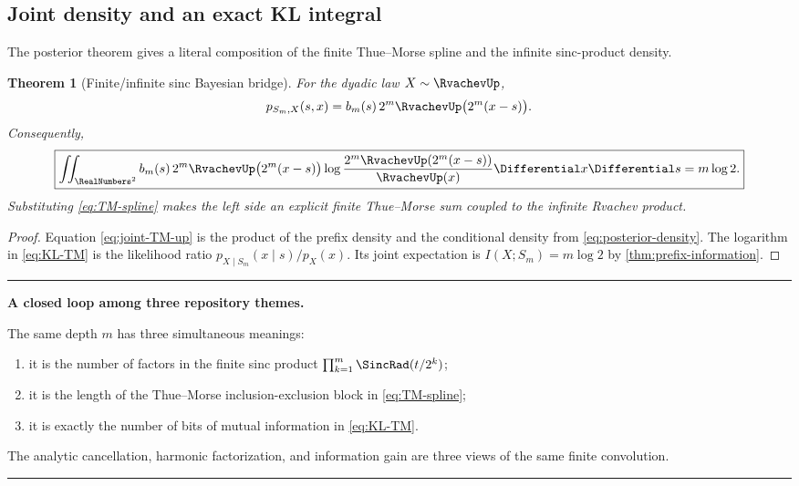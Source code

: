 \documentclass[11pt,oneside]{article}
\newtheorem{theorem}{Theorem}[section]
\theoremstyle{definition}
\theoremstyle{remark}
\newenvironment{resultbox}[1][Frontier result]{%
  \par\medskip\noindent
  \begin{center}\begin{minipage}{0.94\textwidth}
  \color{black}\hrule\vspace{0.55em}
  \textbf{#1.}\quad
}{%
  \vspace{0.55em}\hrule
  \end{minipage}\end{center}\medskip
}
\begin{document}
\subsection{Joint density and an exact KL integral}

The posterior theorem gives a literal composition of the finite Thue--Morse
spline and the infinite sinc-product density.

\begin{theorem}[Finite/infinite sinc Bayesian bridge]
\label{thm:KL-TM}
For the dyadic law $X\sim\RvachevUp$,
\begin{equation}
 p_{S_m,X}(s,x)
 =b_m(s)\,2^m\RvachevUp\bigl(2^m(x-s)\bigr).
 \label{eq:joint-TM-up}
\end{equation}
Consequently,
\begin{equation}
 \boxed{
 \iint_{\RealNumbers^2} b_m(s)\,2^m\RvachevUp\bigl(2^m(x-s)\bigr)
 \log\frac{2^m\RvachevUp(2^m(x-s))}{\RvachevUp(x)}\Differential x\Differential s
 =m\log2.}
 \label{eq:KL-TM}
\end{equation}
Substituting \eqref{eq:TM-spline} makes the left side an explicit finite
Thue--Morse sum coupled to the infinite Rvachev product.
\end{theorem}

\begin{proof}
Equation \eqref{eq:joint-TM-up} is the product of the prefix density and the
conditional density from \eqref{eq:posterior-density}.  The logarithm in
\eqref{eq:KL-TM} is the likelihood ratio
$p_{X\mid S_m}(x\mid s)/p_X(x)$.  Its joint expectation is
$I(X;S_m)=m\log2$ by \cref{thm:prefix-information}.
\end{proof}

\begin{resultbox}[A closed loop among three repository themes]
The same depth $m$ has three simultaneous meanings:
\begin{enumerate}
\item it is the number of factors in the finite sinc product
      $\prod_{k=1}^m\SincRad(t/2^k)$;
\item it is the length of the Thue--Morse inclusion-exclusion block in
      \eqref{eq:TM-spline};
\item it is exactly the number of bits of mutual information in
      \eqref{eq:KL-TM}.
\end{enumerate}
The analytic cancellation, harmonic factorization, and information gain are three
views of the same finite convolution.
\end{resultbox}
\end{document}
